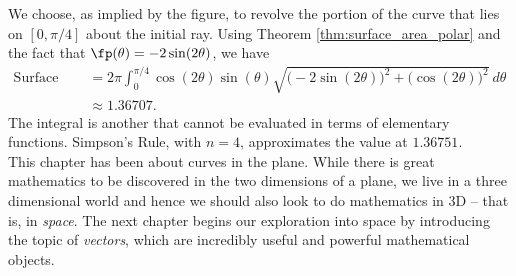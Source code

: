 {
We choose, as implied by the figure, to revolve the portion of the curve that lies on $[0,\pi/4]$ about the initial ray. Using Theorem \ref{thm:surface_area_polar} and the fact that $\fp(\theta) = -2\sin(2\theta)$, we have
\begin{align*}
\text{Surface Area} &= 2\pi\int_0^{\pi/4} \cos(2\theta)\sin(\theta)\sqrt{\big(-2\sin(2\theta)\big)^2+\big(\cos(2\theta)\big)^2}\ d\theta \\
&\approx 1.36707.
\end{align*}
The integral is another that cannot be evaluated in terms of elementary functions. Simpson's Rule, with $n=4$, approximates the value at $1.36751$.%
}\\


This chapter has been about curves in the plane. While there is great mathematics to be discovered in the two dimensions of a plane, we live in a three dimensional world and hence we should also look to do mathematics in 3D -- that is, in \emph{space}. The next chapter begins our exploration into space by introducing the topic of \emph{vectors}, which are incredibly useful and powerful mathematical objects.
